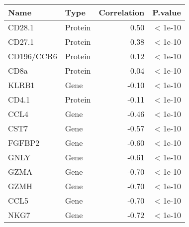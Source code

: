 \begin{tabular}{llrl}
  \hline
Name & Type & Correlation & P.value \\ 
  \hline
CD28.1 & Protein & 0.50 & $<$1e-10 \\ 
  CD27.1 & Protein & 0.38 & $<$1e-10 \\ 
  CD196/CCR6 & Protein & 0.12 & $<$1e-10 \\ 
  CD8a & Protein & 0.04 & $<$1e-10 \\ 
  KLRB1 & Gene & -0.10 & $<$1e-10 \\ 
  CD4.1 & Protein & -0.11 & $<$1e-10 \\ 
  CCL4 & Gene & -0.46 & $<$1e-10 \\ 
  CST7 & Gene & -0.57 & $<$1e-10 \\ 
  FGFBP2 & Gene & -0.60 & $<$1e-10 \\ 
  GNLY & Gene & -0.61 & $<$1e-10 \\ 
  GZMA & Gene & -0.70 & $<$1e-10 \\ 
  GZMH & Gene & -0.70 & $<$1e-10 \\ 
  CCL5 & Gene & -0.70 & $<$1e-10 \\ 
  NKG7 & Gene & -0.72 & $<$1e-10 \\ 
   \hline
\end{tabular}
